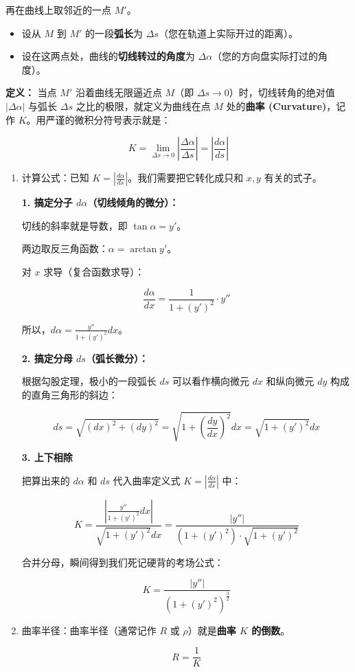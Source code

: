\documentclass[
]{article}
\begin{document}
再在曲线上取邻近的一点 \(M'\)。

\begin{itemize}
\item
  设从 \(M\) 到 \(M'\) 的一段\textbf{弧长}为
  \textbf{\(\Delta s\)}（您在轨道上实际开过的距离）。
\item
  设在这两点处，曲线的\textbf{切线转过的角度}为
  \textbf{\(\Delta \alpha\)}（您的方向盘实际打过的角度）。
\end{itemize}

\textbf{定义：} 当点 \(M'\) 沿着曲线无限逼近点 \(M\)（即
\(\Delta s \to 0\)）时，切线转角的绝对值 \(|\Delta \alpha|\) 与弧长
\(\Delta s\) 之比的极限，就定义为曲线在点 \(M\) 处的\textbf{曲率
(Curvature)}，记作 \(K\)。用严谨的微积分符号表示就是：

\[K = \lim_{\Delta s \to 0} \left| \frac{\Delta \alpha}{\Delta s} \right| = \left| \frac{d\alpha}{ds} \right|\]

\begin{enumerate}
\def\labelenumi{\arabic{enumi}.}
\item
  计算公式：已知
  \(K = \left| \frac{d\alpha}{ds} \right|\)。我们需要把它转化成只和
  \(x, y\) 有关的式子。

  \textbf{1. 搞定分子 \(d\alpha\)（切线倾角的微分）：}

  切线的斜率就是导数，即 \(\tan \alpha = y'\)。

  两边取反三角函数：\(\alpha = \arctan y'\)。

  对 \(x\) 求导（复合函数求导）：

  \[\frac{d\alpha}{dx} = \frac{1}{1 + (y')^2} \cdot y''\]

  所以，\textbf{\(d\alpha = \frac{y''}{1 + (y')^2} dx\)}。

  \textbf{2. 搞定分母 \(ds\)（弧长微分）：}

  根据勾股定理，极小的一段弧长 \(ds\) 可以看作横向微元 \(dx\) 和纵向微元
  \(dy\) 构成的直角三角形的斜边：

  \[ds = \sqrt{(dx)^2 + (dy)^2} = \sqrt{1 + \left(\frac{dy}{dx}\right)^2} dx = \sqrt{1 + (y')^2} dx\]

  \textbf{3. 上下相除}

  把算出来的 \(d\alpha\) 和 \(ds\) 代入曲率定义式
  \(K = \left| \frac{d\alpha}{ds} \right|\) 中：

  \[K = \frac{\left| \frac{y''}{1 + (y')^2} dx \right|}{\sqrt{1 + (y')^2} dx} = \frac{|y''|}{(1 + (y')^2) \cdot \sqrt{1 + (y')^2}}\]

  合并分母，瞬间得到我们死记硬背的考场公式：

  \[K = \frac{|y''|}{(1 + (y')^2)^{\frac{3}{2}}}\]
\item
  曲率半径：曲率半径（通常记作 \(R\) 或 \(\rho\)）就是\textbf{曲率 \(K\)
  的倒数}。

  \[R = \frac{1}{K}\]
\end{enumerate}
\end{document}
